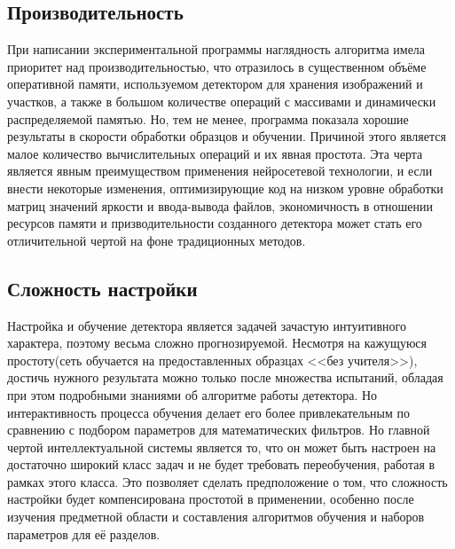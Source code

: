 \documentclass[a4paper,12pt]{report}
\begin{document}
\subsection{Производительность}
При написании экспериментальной программы наглядность алгоритма имела приоритет над производительностью, что отразилось в существенном объёме оперативной памяти, используемом детектором для хранения изображений и участков, а также в большом количестве операций с массивами и динамически распределяемой памятью. Но, тем не менее, программа показала хорошие результаты в скорости обработки образцов и обучении. Причиной этого является малое количество вычислительных операций и их явная простота. Эта черта является явным преимуществом применения нейросетевой технологии, и если внести некоторые изменения, оптимизирующие код на низком уровне обработки матриц значений яркости и ввода-вывода файлов, экономичность в отношении ресурсов памяти и призводительности созданного детектора может стать его отличительной чертой на фоне традиционных методов.

\subsection{Сложность настройки}
Настройка и обучение детектора является задачей зачастую интуитивного характера, поэтому весьма сложно прогнозируемой. Несмотря на кажущуюся простоту(сеть обучается на предоставленных образцах <<без учителя>>), достичь нужного результата можно только после множества испытаний, обладая при этом подробными знаниями об алгоритме работы детектора. Но интерактивность процесса обучения делает его более привлекательным по сравнению с подбором параметров для математических фильтров. Но главной чертой интеллектуальной системы является то, что он может быть настроен на достаточно широкий класс задач и не будет требовать переобучения, работая в рамках этого класса. Это позволяет сделать предположение о том, что сложность настройки будет компенсирована простотой в применении, особенно после изучения предметной области и составления алгоритмов обучения и наборов параметров для её разделов.

\setcounter{secnumdepth}{-1}
\end{document}
